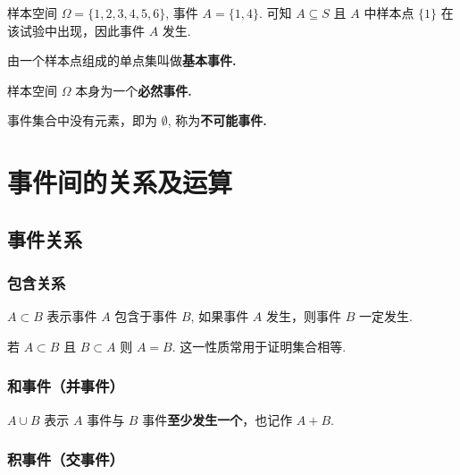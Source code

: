 \documentclass[12pt, a4paper, oneside, UTF8]{ctexbook}
\begin{document}
\begin{solution}
    样本空间 \(\Omega = \{1 , 2 , 3 , 4 , 5 , 6\}\), 事件 \(A = \{1 , 4\}\). 可知 \(A \subseteq S\) 且 \(A\) 中样本点 \(\{1\}\) 在该试验中出现，因此事件 \(A\) 发生.
\end{solution}

\begin{defn}
    由一个样本点组成的单点集叫做\bf{基本事件}.
\end{defn}

\begin{defn}
    样本空间 \(\Omega\) 本身为一个\bf{必然事件}.
\end{defn}

\begin{defn}
    事件集合中没有元素，即为 \(\emptyset \), 称为\bf{不可能事件}.
\end{defn}

\section{事件间的关系及运算}

\subsection{事件关系}

\subsubsection{包含关系}

\begin{defn}
    \(A \subset B\) 表示事件 \(A\) 包含于事件 \(B\), 如果事件 \(A\) 发生，则事件 \(B\) 一定发生.
\end{defn}

\begin{rmk}
    若 \(A \subset B\) 且 \(B \subset A\) 则 \(A = B\). 这一性质常用于证明集合相等.
\end{rmk}

\subsubsection{和事件（并事件）}

\begin{defn}
    \(A \cup B\) 表示 \(A\) 事件与 \(B\) 事件\textbf{至少发生一个}，也记作 \(A + B\).
\end{defn}

\subsubsection{积事件（交事件）}
\end{document}
